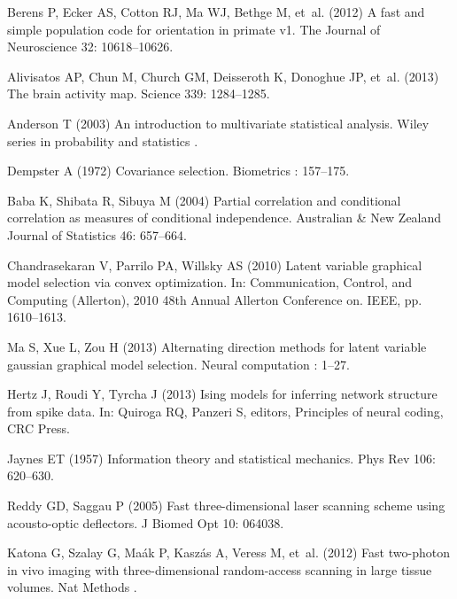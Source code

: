 \begin{thebibliography}{100}
Berens P, Ecker AS, Cotton RJ, Ma WJ, Bethge M, et~al. (2012) A fast and simple
  population code for orientation in primate v1.
\newblock The Journal of Neuroscience 32: 10618--10626.

Alivisatos AP, Chun M, Church GM, Deisseroth K, Donoghue JP, et~al. (2013) The
  brain activity map.
\newblock Science 339: 1284--1285.

Anderson T (2003) An introduction to multivariate statistical analysis.
\newblock Wiley series in probability and statistics .

Dempster A (1972) Covariance selection.
\newblock Biometrics : 157--175.

Baba K, Shibata R, Sibuya M (2004) Partial correlation and conditional
  correlation as measures of conditional independence.
\newblock Australian \& New Zealand Journal of Statistics 46: 657--664.

Chandrasekaran V, Parrilo PA, Willsky AS (2010) Latent variable graphical model
  selection via convex optimization.
\newblock In: Communication, Control, and Computing (Allerton), 2010 48th
  Annual Allerton Conference on. IEEE, pp. 1610--1613.

Ma S, Xue L, Zou H (2013) Alternating direction methods for latent variable
  gaussian graphical model selection.
\newblock Neural computation : 1--27.

Hertz J, Roudi Y, Tyrcha J (2013) Ising models for inferring network structure
  from spike data.
\newblock In: Quiroga RQ, Panzeri S, editors, Principles of neural coding, CRC
  Press.

Jaynes ET (1957) Information theory and statistical mechanics.
\newblock Phys Rev 106: 620--630.

Reddy GD, Saggau P (2005) Fast three-dimensional laser scanning scheme using
  acousto-optic deflectors.
\newblock J Biomed Opt 10: 064038.

Katona G, Szalay G, Ma{\'a}k P, Kasz{\'a}s A, Veress M, et~al. (2012) Fast
  two-photon in vivo imaging with three-dimensional random-access scanning in
  large tissue volumes.
\newblock Nat Methods .


\end{thebibliography}
